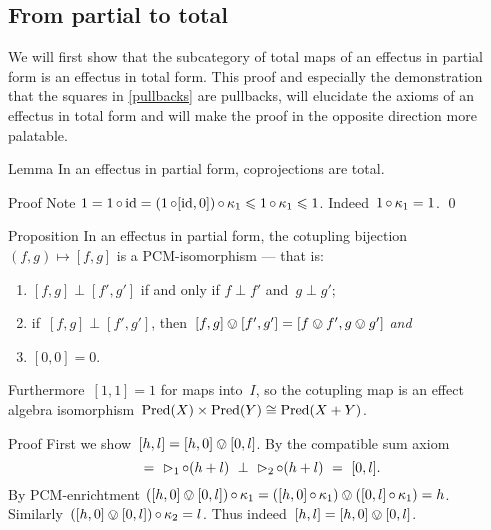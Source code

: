 \documentclass[b]{subfiles}
\begin{document}
\subsection{From partial to total}
\begin{parsec}%
\begin{point}%
We will first show that the subcategory of
    total maps of an effectus in partial form
    is an effectus in total form.
This proof and especially the demonstration
    that the squares in \eqref{pullbacks} are pullbacks,
    will elucidate the axioms of an effectus in total form
    and will make the proof in the opposite direction more palatable.
\end{point}
\begin{point}{Lemma}%
In an effectus in partial form,
    coprojections are total.
\begin{point}{Proof}%
Note
$1 = 1 \mathop{\circ} \operatorname{id} = (1 \mathop{\circ} [\operatorname{id}, 0]) \mathop{\circ} \kappa_1
                    \leqslant 1 \mathop{\circ} \kappa_1 \leqslant 1$.
Indeed~$1 \mathop{\circ} \kappa_1 = 1$. \qed
\end{point}
\end{point}
\begin{point}{Proposition}%
In an effectus in partial form,
the cotupling bijection~$(f,g) \mapsto [f,g]$
    is a PCM-isomorphism ---
    that is:
\begin{enumerate}
\item
    $[f,g] \perp [f',g']$ if and only if
        $f \perp f'$ and~$g \perp g'$;
\item
    if~$[f,g] \perp [f', g']$,
    then~$[f,g] \ovee [f',g'] = [f \ovee f', g\ovee g']$ \emph{and}
\item
    $[0,0] = 0$.
\end{enumerate}
Furthermore~$[1,1]=1$ for maps into~$I$,
so the cotupling map is an effect algebra
isomorphism~$\operatorname{Pred} (X) \times \operatorname{Pred} (Y) \cong \operatorname{Pred} (X+Y) $.
\begin{point}{Proof}%
First we show~$[h,l] = [h,0] \ovee [0,l]$.
By the compatible sum axiom
\begin{equation*}
    [h, 0] \ = \ 
    \pproj_1 \after (h + l)
    \ \perp\  \pproj_2 \after (h + l)
    \ = \ [0, l].
\end{equation*}
By PCM-enrichtment
$([h, 0] \ovee [0, l]) \mathop{\circ} \kappa_1
         =  ([h, 0] \mathop{\circ} \kappa_1) \ovee
        ([0, l] \mathop{\circ} \kappa_1)  = h$.
Similarly~$([h, 0] \ovee [0, l]) \mathop{\circ} \kappa_2 = l$.
Thus indeed~$[h,l] = [h,0] \ovee [0,l]$.


\end{point}
\end{point}
\end{parsec}
\end{document}
